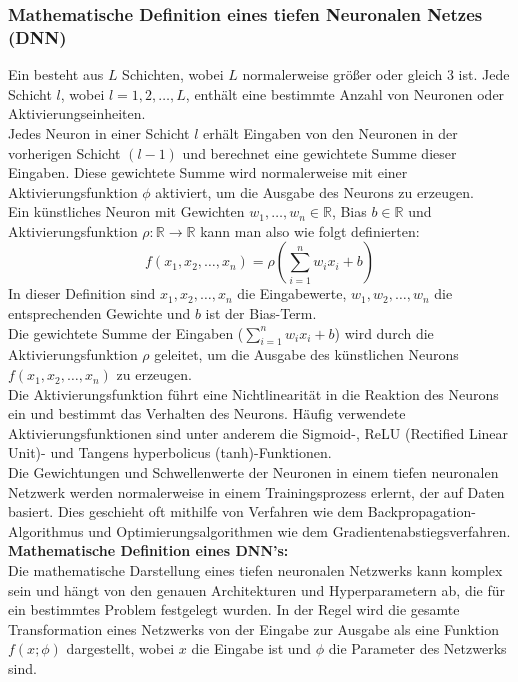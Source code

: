\documentclass[12pt]{article}
\begin{document}
\subsubsection{Mathematische Definition eines tiefen Neuronalen Netzes (DNN)}
%
Ein {\color{blue}{tiefes neuronales Netzwerk}} besteht aus $L$ Schichten, wobei $L$ normalerweise größer oder gleich 3 ist. Jede Schicht $l$, wobei $l = 1, 2, \ldots, L$, enthält eine bestimmte Anzahl von Neuronen oder Aktivierungseinheiten.\\
%
Jedes Neuron in einer Schicht $l$ erhält Eingaben von den Neuronen in der vorherigen Schicht $(l-1)$ und berechnet eine gewichtete Summe dieser Eingaben. Diese gewichtete Summe wird normalerweise mit einer Aktivierungsfunktion $\phi$ aktiviert, um die Ausgabe des Neurons zu erzeugen.\\[0.1cm]
Ein künstliches Neuron mit Gewichten $w_1, \ldots, w_n \in \mathbb{R}$, Bias $b \in \mathbb{R}$ und Aktivierungsfunktion $\rho : \mathbb{R} \rightarrow \mathbb{R}$ kann man also wie folgt definierten:
\[
f(x_1, x_2, \ldots, x_n) = \rho\left(\sum_{i=1}^{n} w_i x_i + b\right)
\]
%
In dieser Definition sind $x_1, x_2, \ldots, x_n$ die Eingabewerte, $w_1, w_2, \ldots, w_n$ die entsprechenden Gewichte und $b$ ist der Bias-Term. \\
Die gewichtete Summe der Eingaben ($\sum_{i=1}^{n} w_i x_i + b$) wird durch die Aktivierungsfunktion $\rho$ geleitet, um die Ausgabe des künstlichen Neurons $f(x_1, x_2, \ldots, x_n)$ zu erzeugen.\\ 
Die Aktivierungsfunktion führt eine Nichtlinearität in die Reaktion des Neurons ein und bestimmt das Verhalten des Neurons. Häufig verwendete Aktivierungsfunktionen sind unter anderem die Sigmoid-, ReLU (Rectified Linear Unit)- und Tangens hyperbolicus (tanh)-Funktionen.\\
%
Die Gewichtungen und Schwellenwerte der Neuronen in einem tiefen neuronalen Netzwerk werden normalerweise in einem Trainingsprozess erlernt, der auf Daten basiert. Dies geschieht oft mithilfe von Verfahren wie dem Backpropagation-Algorithmus und Optimierungsalgorithmen wie dem Gradientenabstiegsverfahren.\\[0.2cm]
%
\textbf{Mathematische Definition eines DNN's:}\\
Die mathematische Darstellung eines tiefen neuronalen Netzwerks kann komplex sein und hängt von den genauen Architekturen und Hyperparametern ab, die für ein bestimmtes Problem festgelegt wurden. In der Regel wird die gesamte Transformation eines Netzwerks von der Eingabe zur Ausgabe als eine Funktion $f(x; \phi)$ dargestellt, wobei $x$ die Eingabe ist und $\phi$ die Parameter des Netzwerks sind.\\[0.2cm]
\end{document}
